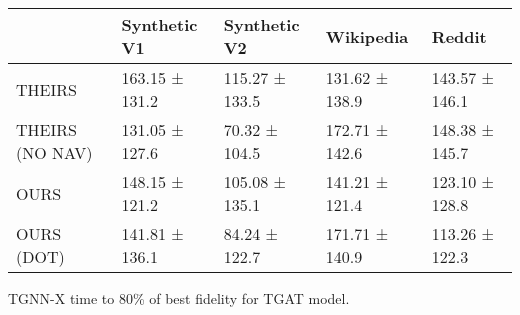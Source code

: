 \begin{tabular}{lllll}
\toprule
 & Synthetic V1 & Synthetic V2 & Wikipedia & Reddit \\
\midrule
THEIRS & 163.15 ± 131.2 & 115.27 ± 133.5 & 131.62 ± 138.9 & 143.57 ± 146.1 \\
THEIRS (NO NAV) & 131.05 ± 127.6 & 70.32 ± 104.5 & 172.71 ± 142.6 & 148.38 ± 145.7 \\
OURS & 148.15 ± 121.2 & 105.08 ± 135.1 & 141.21 ± 121.4 & 123.10 ± 128.8 \\
OURS (DOT) & 141.81 ± 136.1 & 84.24 ± 122.7 & 171.71 ± 140.9 & 113.26 ± 122.3 \\
\bottomrule
\end{tabular}
\caption{\label{tab:tgat_time}TGNN-X time to 80\% of best fidelity for TGAT model.}


